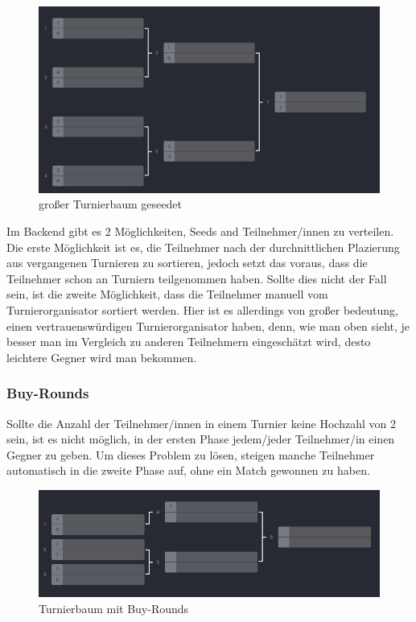 \begin{figure}[H]
    \includegraphics[scale=0.25]{pics/backend/elimination/elimination_tree_seeded_big.png}
    \caption{großer Turnierbaum geseedet\cite{implementation-execution-1}}
\end{figure}

Im Backend gibt es 2 Möglichkeiten, Seeds and Teilnehmer/innen zu verteilen. Die erste Möglichkeit ist es, die Teilnehmer nach der durchnittlichen Plazierung aus vergangenen Turnieren zu sortieren, 
jedoch setzt das voraus, dass die Teilnehmer schon an Turniern teilgenommen haben. Sollte dies nicht der Fall sein, ist die zweite Möglichkeit, dass die Teilnehmer manuell vom Turnierorganisator sortiert werden.
Hier ist es allerdings von großer bedeutung, einen vertrauenswürdigen Turnierorganisator haben, denn, wie man oben sieht, je besser man im Vergleich zu anderen Teilnehmern eingeschätzt wird, desto leichtere Gegner wird man bekommen.

\subsubsection{Buy-Rounds}

Sollte die Anzahl der Teilnehmer/innen in einem Turnier keine Hochzahl von 2 sein, ist es nicht möglich, in der ersten Phase jedem/jeder Teilnehmer/in einen Gegner zu geben. 
Um dieses Problem zu lösen, steigen manche Teilnehmer automatisch in die zweite Phase auf, ohne ein Match gewonnen zu haben.

\begin{figure}[H]
    \includegraphics[scale=0.75]{pics/backend/elimination/elimination_buy_rounds.png}
    \caption{Turnierbaum mit Buy-Rounds\cite{implementation-execution-1}}
\end{figure}

